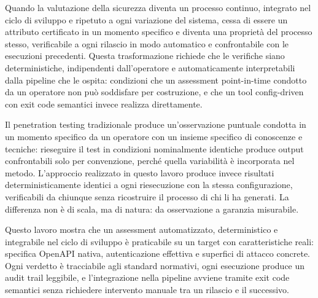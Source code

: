 Quando la valutazione della sicurezza diventa un processo continuo, integrato nel ciclo di sviluppo e ripetuto a ogni variazione del sistema, cessa di essere un attributo certificato in un momento specifico e diventa una proprietà del processo stesso, verificabile a ogni rilascio in modo automatico e confrontabile con le esecuzioni precedenti. Questa trasformazione richiede che le verifiche siano deterministiche, indipendenti dall'operatore e automaticamente interpretabili dalla pipeline che le ospita: condizioni che un assessment point-in-time condotto da un operatore non può soddisfare per costruzione, e che un tool config-driven con exit code semantici invece realizza direttamente.

Il penetration testing tradizionale produce un'osservazione puntuale condotta in un momento specifico da un operatore con un insieme specifico di conoscenze e tecniche: rieseguire il test in condizioni nominalmente identiche produce output confrontabili solo per convenzione, perché quella variabilità è incorporata nel metodo. L'approccio realizzato in questo lavoro produce invece risultati deterministicamente identici a ogni riesecuzione con la stessa configurazione, verificabili da chiunque senza ricostruire il processo di chi li ha generati. La differenza non è di scala, ma di natura: da osservazione a garanzia misurabile.

Questo lavoro mostra che un assessment automatizzato, deterministico e integrabile nel ciclo di sviluppo è praticabile su un target con caratteristiche reali: specifica OpenAPI nativa, autenticazione effettiva e superfici di attacco concrete. Ogni verdetto è tracciabile agli standard normativi, ogni esecuzione produce un audit trail leggibile, e l'integrazione nella pipeline avviene tramite exit code semantici senza richiedere intervento manuale tra un rilascio e il successivo.